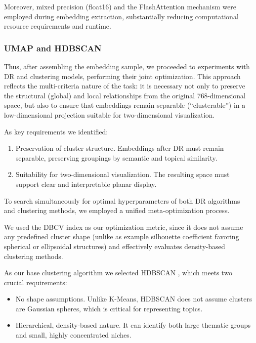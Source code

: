 Moreover, mixed precision (float16) and the FlashAttention mechanism \parencite{flash2022attention} were
employed during embedding extraction, substantially reducing computational resource requirements and runtime.

\subsubsection{UMAP and HDBSCAN}
\label{sec:drc}
Thus, after assembling the embedding sample, we proceeded to experiments with DR and clustering
models, performing their joint optimization. This approach reflects the multi-criteria nature of the task: it is necessary
not only to preserve the structural (global) and local relationships from the original 768-dimensional space, but also
to ensure that embeddings remain separable (“clusterable”) in a low-dimensional projection suitable for two-dimensional
visualization.

As key requirements we identified:

\begin{enumerate}
    \item Preservation of cluster structure. Embeddings after DR must remain separable,
    preserving groupings by semantic and topical similarity.
    \item Suitability for two-dimensional visualization. The resulting space must support clear and interpretable
    planar display.
\end{enumerate}

To search simultaneously for optimal hyperparameters of both DR algorithms and clustering methods,
we employed a unified meta-optimization process.

We used the DBCV index as our optimization metric, since it does not assume any predefined cluster shape (unlike as example
silhouette coefficient favoring spherical or ellipsoidal structures) and effectively evaluates density-based clustering
methods.

As our base clustering algorithm we selected HDBSCAN \parencite{HDBSCAN2013}, which meets two crucial requirements:

\begin{itemize}
    \item No shape assumptions. Unlike K-Means, HDBSCAN does not assume clusters are Gaussian spheres, which is critical
    for representing topics.
    \item Hierarchical, density-based nature. It can identify both large thematic groups and small, highly concentrated niches.
\end{itemize}


